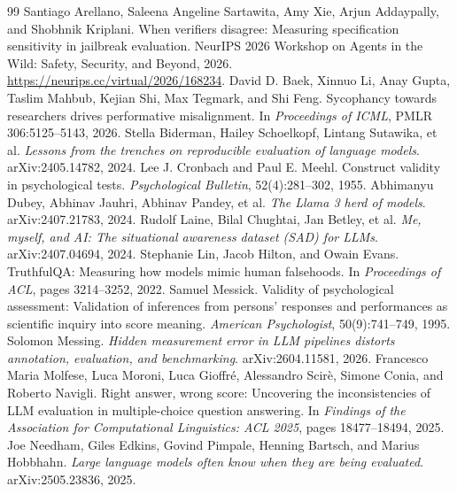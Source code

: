 \documentclass[10pt]{article}
\begin{document}
\begin{thebibliography}{99}
 Santiago Arellano, Saleena Angeline Sartawita, Amy Xie, Arjun Addaypally, and Shobhnik Kriplani. When verifiers disagree: Measuring specification sensitivity in jailbreak evaluation. NeurIPS 2026 Workshop on Agents in the Wild: Safety, Security, and Beyond, 2026. \url{https://neurips.cc/virtual/2026/168234}.
 David D. Baek, Xinnuo Li, Anay Gupta, Taslim Mahbub, Kejian Shi, Max Tegmark, and Shi Feng. Sycophancy towards researchers drives performative misalignment. In \emph{Proceedings of ICML}, PMLR 306:5125--5143, 2026.
 Stella Biderman, Hailey Schoelkopf, Lintang Sutawika, et al. \emph{Lessons from the trenches on reproducible evaluation of language models}. arXiv:2405.14782, 2024.
 Lee J. Cronbach and Paul E. Meehl. Construct validity in psychological tests. \emph{Psychological Bulletin}, 52(4):281--302, 1955.
 Abhimanyu Dubey, Abhinav Jauhri, Abhinav Pandey, et al. \emph{The Llama 3 herd of models}. arXiv:2407.21783, 2024.
 Rudolf Laine, Bilal Chughtai, Jan Betley, et al. \emph{Me, myself, and AI: The situational awareness dataset (SAD) for LLMs}. arXiv:2407.04694, 2024.
 Stephanie Lin, Jacob Hilton, and Owain Evans. TruthfulQA: Measuring how models mimic human falsehoods. In \emph{Proceedings of ACL}, pages 3214--3252, 2022.
 Samuel Messick. Validity of psychological assessment: Validation of inferences from persons' responses and performances as scientific inquiry into score meaning. \emph{American Psychologist}, 50(9):741--749, 1995.
 Solomon Messing. \emph{Hidden measurement error in LLM pipelines distorts annotation, evaluation, and benchmarking}. arXiv:2604.11581, 2026.
 Francesco Maria Molfese, Luca Moroni, Luca Gioffr\'e, Alessandro Scir\`e, Simone Conia, and Roberto Navigli. Right answer, wrong score: Uncovering the inconsistencies of LLM evaluation in multiple-choice question answering. In \emph{Findings of the Association for Computational Linguistics: ACL 2025}, pages 18477--18494, 2025.
 Joe Needham, Giles Edkins, Govind Pimpale, Henning Bartsch, and Marius Hobbhahn. \emph{Large language models often know when they are being evaluated}. arXiv:2505.23836, 2025.

\end{thebibliography}
\end{document}
